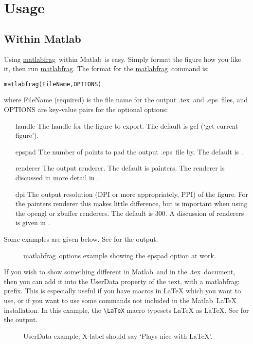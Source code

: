 \documentclass[a4paper,11pt]{article}
\newcommand\matlabfrag{\texorpdfstring{\href{http://www.mathworks.com/matlabcentral/fileexchange/21286}{{\ttfamily matlabfrag}}}{matlabfrag}}
\newcommand\matlab{\texorpdfstring{{\sc Matlab}}{Matlab}}
\newcommand\tex{\texorpdfstring{{\sc .tex}}{.tex}}
\newcommand\eps{\texorpdfstring{{\sc .eps}}{.eps}}
\def\'#1'{{\ttfamily \textquotesingle #1\textquotesingle}}
\begin{document}
  \section{Usage}%
    \subsection{Within \matlab}%
      Using \matlabfrag\ within \matlab\ is easy. Simply format the figure how you like it, then run
      \matlabfrag. The format for the \matlabfrag\ command is:
      \begin{verbatim}
matlabfrag(FileName,OPTIONS)
      \end{verbatim}
      where {\ttfamily FileName} (required) is the file name for the output \tex\ and \eps\ files, and 
      {\ttfamily OPTIONS} are key-value pairs for the optional options:
      \begin{itemize}
        \item[{\'handle'}] The handle for the figure to export. The default is {\ttfamily gcf} (`get 
		  current figure').
        \item[{\'epspad'}] The number of points to pad the output \eps\ file by. The default is {\ttfamily [0,0,0,0]}.
        \item[{\'renderer'}] The output renderer. The default is {\ttfamily painters}. The renderer is
          discussed in more detail in .
        \item[{\'dpi'}] The output resolution (DPI or more appropriately, PPI) of the figure.
          For the {\ttfamily painters} renderer this makes little difference, but is important when
          using the {\ttfamily opengl} or {\ttfamily zbuffer} renderers. The default is 300. A
          discussion of renderers is given in .
      \end{itemize}
      Some examples are given below.\nobreak
      See  for the output.
      \begin{figure}[ht]
        \centering
        \quad
        \caption{\matlabfrag\ options example showing the {\ttfamily epspad} option at work.}
      \end{figure}
      
      If you wish to show something different in \matlab\ and in the \tex\ document, then you
      can add it into the {\ttfamily UserData} property of the text, with a {\ttfamily matlabfrag:} prefix. This is
      especially useful if you have macros in LaTeX which you want to use, or if you want to use some
      commands not included in the \matlab\ LaTeX installation. In this example, the \verb|\LaTeX| macro
      typesets LaTeX as \LaTeX.
      See  for the output.
      \begin{figure}[ht]
        \centering
        \caption{UserData example; X-label should say `Plays nice with \LaTeX'.}
      \end{figure}
      
\end{document}
